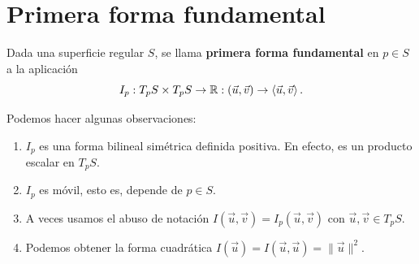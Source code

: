 \section{Primera forma fundamental}
\begin{definition}
Dada una superficie regular $\displaystyle S $, se llama \textbf{primera forma fundamental} en $\displaystyle p \in S $ a la aplicación
\[I _{p} : T_{p}S \times T_{p}S \to \mathbb{R} : \left(\vec{u}, \vec{v}\right)\to \left\langle \vec{u}, \vec{v} \right\rangle  .\]
\end{definition}
\begin{observation} Podemos hacer algunas observaciones:
\begin{enumerate}
\item $\displaystyle I_{p} $ es una forma bilineal simétrica definida positiva. En efecto, es un producto escalar en $\displaystyle T_{p}S $. 
\item $\displaystyle I_{p} $ es móvil, esto es, depende de $\displaystyle p \in S $.
\item A veces usamos el abuso de notación $\displaystyle I\left(\vec{u}, \vec{v}\right)=I_{p}\left( \vec{u}, \vec{v}\right) $ con $\displaystyle \vec{u}, \vec{v}\in T_{p}S $. 
\item Podemos obtener la forma cuadrática $\displaystyle I\left(\vec{u}\right)=I\left(\vec{u}, \vec{u}\right)= \|\vec{u}\|^{2} $. 
\end{enumerate}
\end{observation}


